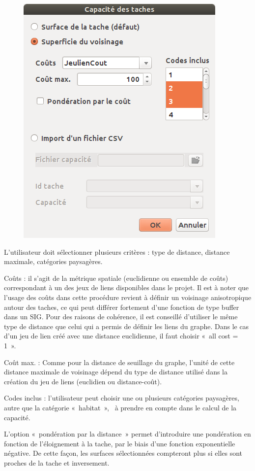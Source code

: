 \documentclass{article}
\begin{document}
\begin{figure}[H]
	\includegraphics[scale=0.5]{img/manual-fr_img8.png} 
\end{figure}

L’utilisateur doit sélectionner plusieurs critères : type de distance, distance maximale, catégories paysagères.

Coûts : il s’agit de la métrique spatiale (euclidienne ou ensemble de coûts) correspondant à un des jeux de liens disponibles dans le projet. Il est à noter que l’usage des coûts dans cette procédure revient à définir un voisinage anisotropique autour des taches, ce qui peut différer fortement d’une fonction de type buffer dans un SIG. Pour des raisons de cohérence, il est conseillé d’utiliser le même type de distance que celui qui a permis de définir les liens du graphe. Dans le cas d’un jeu de lien créé avec une distance euclidienne, il faut choisir «~all cost = 1~».

Coût max. : Comme pour la distance de seuillage du graphe, l’unité de cette distance maximale de voisinage dépend du type de distance utilisé dans la création du jeu de liens (euclidien ou distance-coût).

Codes inclus : l’utilisateur peut choisir une ou plusieurs catégories paysagères, autre que la catégorie «~habitat~», ~à prendre en compte dans le calcul de la capacité. 

L’option «~pondération par la distance~» permet d’introduire une pondération en fonction de l’éloignement à la tache, par le biais d’une fonction exponentielle négative. De cette façon, les surfaces sélectionnées compteront plus si elles sont proches de la tache et inversement.
\end{document}
